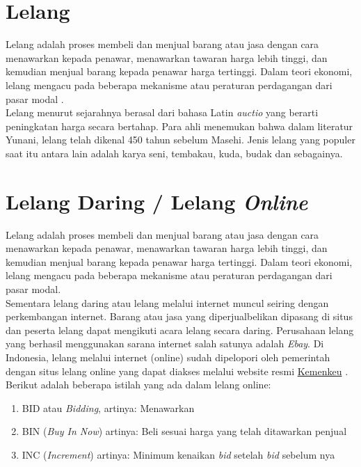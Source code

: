 	\section{Lelang}
	Lelang adalah proses membeli dan menjual barang atau jasa dengan cara menawarkan kepada penawar, menawarkan tawaran harga lebih tinggi, dan kemudian menjual barang kepada penawar harga tertinggi. Dalam teori ekonomi, lelang mengacu pada beberapa mekanisme atau peraturan perdagangan dari pasar modal \cite{balailelang_sejarah_nodate}.
	\\ \indent
	Lelang menurut sejarahnya berasal dari bahasa Latin \textit{auctio} yang berarti peningkatan harga secara bertahap. Para ahli menemukan bahwa dalam literatur Yunani, lelang telah dikenal 450 tahun sebelum Masehi. Jenis lelang yang populer saat itu antara lain adalah karya seni, tembakau, kuda, budak dan sebagainya\cite{pratama_lelang_2012}.
	   
	\section{Lelang Daring / Lelang \textit{Online}}
	Lelang adalah proses membeli dan menjual barang atau jasa dengan cara menawarkan kepada penawar, menawarkan tawaran harga lebih tinggi, dan kemudian menjual barang kepada penawar harga tertinggi. Dalam teori ekonomi, lelang mengacu pada beberapa mekanisme atau peraturan perdagangan dari pasar modal. \\
	Sementara lelang daring atau lelang melalui internet muncul seiring dengan perkembangan internet. Barang atau jasa yang diperjualbelikan dipasang di situs dan peserta lelang dapat mengikuti acara lelang secara daring. Perusahaan lelang yang berhasil menggunakan sarana internet salah satunya adalah \textit{Ebay}. Di Indonesia, lelang melalui internet (online) sudah dipelopori oleh pemerintah dengan situs lelang online yang dapat diakses melalui website resmi \href{https://www.lelangdjkn.kemenkeu.go.id}{Kemenkeu} \cite{wikipedia_lelang_2016}. 
	Berikut adalah beberapa istilah yang ada dalam lelang online:
	\begin{enumerate}
	      	\item BID atau \textit{Bidding}, artinya: Menawarkan
	      	\item BIN (\textit{Buy In Now}) artinya: Beli sesuai harga yang telah ditawarkan penjual
	      	\item INC (\textit{Increment}) artinya: Minimum kenaikan \textit{bid} setelah \textit{bid} sebelum nya \cite{noauthor_arti_nodate}
	\end{enumerate}

